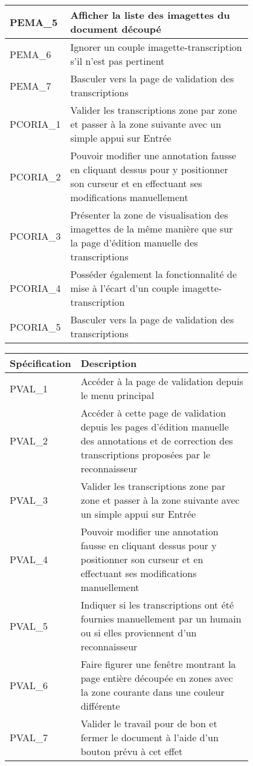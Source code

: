 \begin{center}
\begin{tabular}{ | l | p{0.8\linewidth} | }
        \hline
        PEMA\_5 & Afficher la liste des imagettes du document découpé \\
        \hline
        PEMA\_6 & Ignorer un couple imagette-transcription s’il n’est pas pertinent \\
        \hline
        PEMA\_7 & Basculer vers la page de validation des transcriptions \\
        \hline
        PCORIA\_1 & Valider les transcriptions zone par zone et passer à la zone suivante avec un simple appui sur Entrée \\
        \hline
        PCORIA\_2 & Pouvoir modifier une annotation fausse en cliquant dessus pour y positionner son curseur et en effectuant ses modifications manuellement \\
        \hline
        PCORIA\_3 & Présenter la zone de visualisation des imagettes de la même manière que sur la page d’édition manuelle des transcriptions \\
        \hline
        PCORIA\_4 & Posséder également la fonctionnalité de mise à l’écart d’un couple imagette-transcription \\
        \hline
        PCORIA\_5 & Basculer vers la page de validation des transcriptions \\
        \hline
    \end{tabular}

    \begin{tabular}{ | l | p{0.8\linewidth} | }
        \hline
        \textbf{Spécification} & \textbf{Description} \\
        \hline
        PVAL\_1 & Accéder à la page de validation depuis le menu principal \\
        \hline
        PVAL\_2 & Accéder à cette page de validation depuis les pages d’édition manuelle des annotations et de correction des transcriptions proposées par le reconnaisseur \\
        \hline
        PVAL\_3 & Valider les transcriptions zone par zone et passer à la zone suivante avec un simple appui sur Entrée \\
        \hline
        PVAL\_4 & Pouvoir modifier une annotation fausse en cliquant dessus pour y positionner son curseur et en effectuant ses modifications manuellement \\
        \hline
        PVAL\_5 & Indiquer si les transcriptions ont été fournies manuellement par un humain ou si elles proviennent d’un reconnaisseur \\
        \hline
        \rowcolor{red}PVAL\_6 & Faire figurer une fenêtre montrant la page entière découpée en zones avec la zone courante dans une couleur différente \\
        \hline
        PVAL\_7 & Valider le travail pour de bon et fermer le document à l’aide d’un bouton prévu à cet effet \\
        \hline
    \end{tabular}


\end{center}
